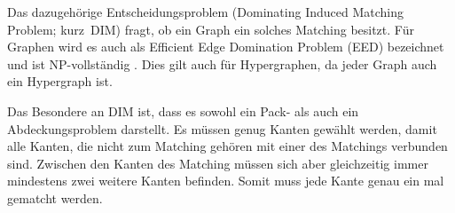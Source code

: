 Das dazugehörige Entscheidungsproblem (Dominating Induced Matching Problem; kurz~DIM) fragt, ob ein Graph ein solches Matching besitzt. Für Graphen wird es auch als Efficient Edge Domination Problem (EED) bezeichnet und ist NP-vollständig \cite{dimNPv}. Dies gilt auch für Hypergraphen, da jeder Graph auch ein Hypergraph ist.

Das Besondere an DIM ist, dass es sowohl ein Pack- als auch ein Abdeckungsproblem darstellt. Es müssen genug Kanten gewählt werden, damit alle Kanten, die nicht zum Matching gehören mit einer des Matchings verbunden sind. Zwischen den Kanten des Matching müssen sich aber gleichzeitig immer mindestens zwei weitere Kanten befinden. Somit muss jede Kante genau ein mal gematcht werden.

\begin{figure}[htb]
\hspace*{\fill}
\end{figure}
